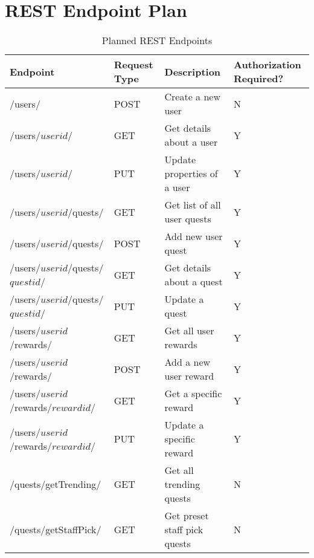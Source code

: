\chapter{REST Endpoint Plan}
\label{appendix:endpoints}

\begin{table}
\centering
\begin{tabular}{|l|p{1.5cm}|l|p{2.1cm}|}
	\hline
	Endpoint & Request Type & Description & Authorization Required? \\ \hline
	/users/ & POST & Create a new user & N \\ \hline
	/users/$userid$/ & GET & Get details about a user & Y \\ \hline
	/users/$userid$/ & PUT & Update properties of a user & Y \\ \hline
	/users/$userid$/quests/ & GET & Get list of all user quests & Y \\ \hline
	/users/$userid$/quests/ & POST & Add new user quest & Y \\ \hline
	/users/$userid$/quests/$questid$/ & GET & Get details about a quest & Y \\ \hline
	/users/$userid$/quests/$questid$/ & PUT & Update a quest & Y \\ \hline
	/users/$userid$/rewards/ & GET & Get all user rewards & Y \\ \hline
	/users/$userid$/rewards/ & POST & Add a new user reward & Y \\ \hline
	/users/$userid$/rewards/$rewardid$/ & GET & Get a specific reward & Y \\ \hline
	/users/$userid$/rewards/$rewardid$/ & PUT & Update a specific reward & Y \\ \hline
	/quests/getTrending/ & GET & Get all trending quests & N \\ \hline
	/quests/getStaffPick/ & GET & Get preset staff pick quests & N \\ \hline
\end{tabular}
\caption{Planned REST Endpoints}
\end{table}